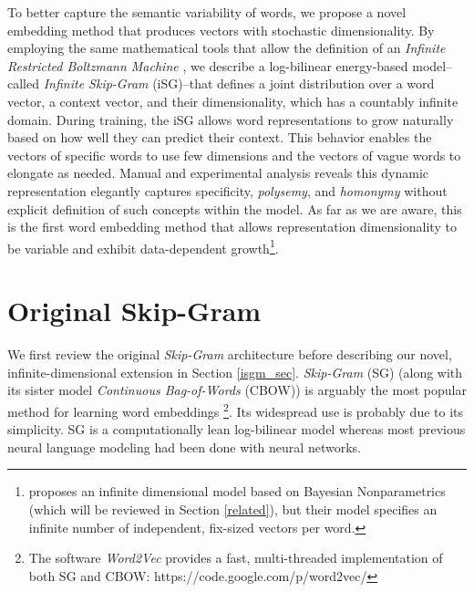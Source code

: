 \documentclass{article} %
\begin{document}
To better capture the semantic variability of words, we propose a novel embedding method that produces vectors with stochastic dimensionality.  By employing the same mathematical tools that allow the definition of an \textit{Infinite Restricted Boltzmann Machine} \citep{cote2015infinite}, we describe a log-bilinear energy-based model--called \textit{Infinite Skip-Gram} (iSG)--that defines a joint distribution over a word vector, a context vector, and their dimensionality, which has a countably infinite domain.  During training, the iSG allows word representations to grow naturally based on how well they can predict their context.  This behavior enables the vectors of specific words to use few dimensions and the vectors of vague words to elongate as needed.  Manual and experimental analysis reveals this dynamic representation elegantly captures specificity, \textit{polysemy}, and \textit{homonymy} without explicit definition of such concepts within the model.  As far as we are aware, this is the first word embedding method that allows representation dimensionality to be variable and exhibit data-dependent growth\footnote{\cite{bartunov2015breaking} proposes an infinite dimensional model based on Bayesian Nonparametrics (which will be reviewed in Section \ref{related}), but their model specifies an infinite number of independent, fix-sized vectors per word.}.

\section{Original Skip-Gram}
We first review the original \textit{Skip-Gram} architecture before describing our novel, infinite-dimensional extension in Section \ref{isgm_sec}.  \textit{Skip-Gram} (SG) (along with its sister model \textit{Continuous Bag-of-Words} (CBOW)) is arguably the most popular method for learning word embeddings \citep{mikolov2013distributed}\footnote{The software \textit{Word2Vec} provides a fast, multi-threaded implementation of both SG and CBOW: https://code.google.com/p/word2vec/}.  Its widespread use is probably due to its simplicity.  SG is a computationally lean log-bilinear model whereas most previous neural language modeling had been done with neural networks.     
\end{document}
